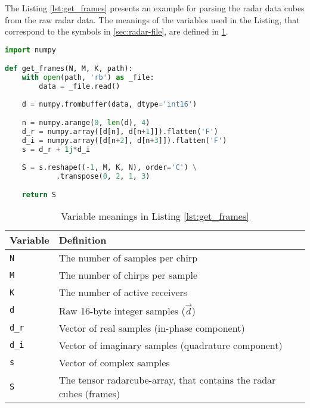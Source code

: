 The Listing \ref{lst:get_frames} presents an example for parsing the radar data cubes from the raw radar data.
The meanings of the variables used in the Listing,
that correspond to the symbols in \ref{sec:radar-file},
are defined in \ref{tab:get_frames_variable_definitions}.

\begin{lstlisting}[language=Python, caption={Code example for extracting radar cubes from the raw radar data.},label={lst:get_frames}]
import numpy

def get_frames(N, M, K, path):
    with open(path, 'rb') as _file:
        data = _file.read()
        
    d = numpy.frombuffer(data, dtype='int16')

    n = numpy.arange(0, len(d), 4)
    d_r = numpy.array([d[n], d[n+1]]).flatten('F')
    d_i = numpy.array([d[n+2], d[n+3]]).flatten('F')
    s = d_r + 1j*d_i
    
    S = s.reshape((-1, M, K, N), order='C') \
            .transpose(0, 2, 1, 3)

    return S
\end{lstlisting}

\begin{table}[]
    \centering
    \begin{tabular}{l l}
        \toprule
            \textbf{Variable} & \textbf{Definition} \\
        \midrule
            \texttt{N} & The number of samples per chirp \\
            \texttt{M} & The number of chirps per sample \\
            \texttt{K} & The number of active receivers \\
            \texttt{d} & Raw 16-byte integer samples ($\vec{d}$) \\
            \texttt{d\_r} & Vector of real samples (in-phase component) \\
            \texttt{d\_i} & Vector of imaginary samples (quadrature component) \\
            \texttt{s} & Vector of complex samples \\
            \texttt{S} & The tensor \gls{radarcube-array}, that contains the radar cubes (frames) \\
        \bottomrule
    \end{tabular}
    \caption{Variable meanings in Listing \ref{lst:get_frames}}
    \label{tab:get_frames_variable_definitions}
\end{table}